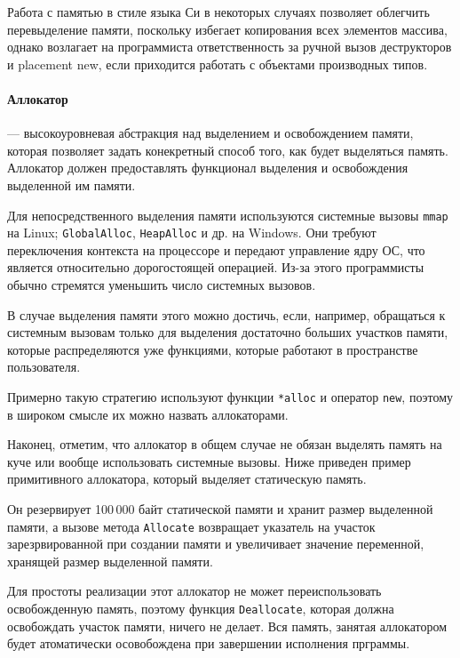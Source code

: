 Работа с памятью в стиле языка Си в некоторых случаях позволяет облегчить
перевыделение памяти, поскольку избегает копирования всех элементов массива,
однако возлагает на программиста ответственность за ручной вызов деструкторов
и placement new, если приходится работать с объектами производных типов.

\paragraph{Аллокатор} --- высокоуровневая абстракция над выделением и освобождением памяти,
которая позволяет задать конекретный способ того, как будет выделяться память. Аллокатор
должен предоставлять функционал выделения и освобождения выделенной им памяти.

Для непосредственного выделения памяти используются системные вызовы
\verb|mmap| на Linux; \verb|GlobalAlloc|, \verb|HeapAlloc| и др. на Windows.
Они требуют переключения контекста на процессоре и передают управление ядру ОС,
что является относительно дорогостоящей операцией. Из-за этого программисты обычно
стремятся уменьшить число системных вызовов.

В случае выделения памяти этого можно достичь, если, например, обращаться к системным вызовам
только для выделения достаточно больших участков памяти, которые распределяются уже функциями,
которые работают в пространстве пользователя.

Примерно такую стратегию используют функции \verb|*alloc| и оператор \verb|new|, поэтому
в широком смысле их можно назвать аллокаторами.

Наконец, отметим, что аллокатор в общем случае не обязан выделять память на куче или вообще использовать
системные вызовы. Ниже приведен пример примитивного аллокатора, который выделяет статическую память.

Он резервирует 100\,000 байт статической памяти и хранит размер
выделенной памяти, а вызове метода \verb|Allocate| возвращает указатель на участок
зарезрвированной при создании памяти и увеличивает значение переменной, хранящей
размер выделенной памяти.

Для простоты реализации этот аллокатор не может переиспользовать освобожденную память,
поэтому функция \verb|Deallocate|, которая должна освобождать участок памяти, ничего не
делает. Вся память, занятая аллокатором будет атоматически осовобождена при завершении исполнения прграммы.

